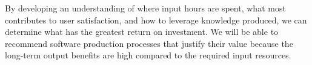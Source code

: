 \documentclass[sigconf, authorversion, nonacm]{acmart}
\begin{document}
By developing an understanding of where input hours are spent, what most
contributes to user satisfaction, and how to leverage knowledge produced,
we can determine what has the greatest return on investment.  We will be able
to recommend software production processes that justify their value because the
long-term output benefits are high compared to the required input resources.  




\end{document}

